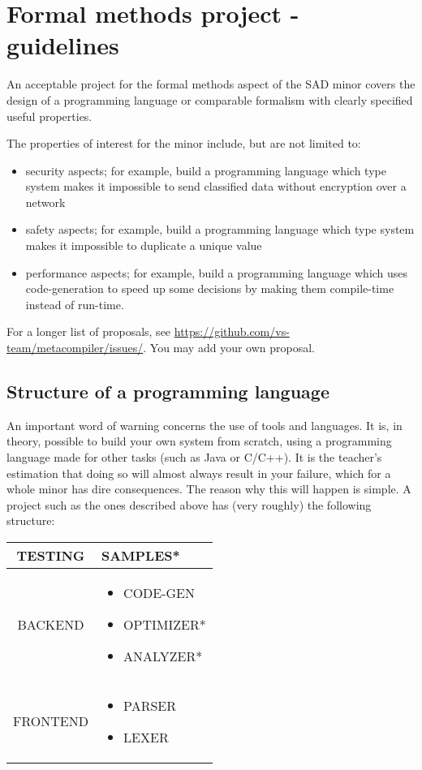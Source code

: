 \section*{Formal methods project - guidelines}
	An acceptable project for the formal methods aspect of the SAD minor covers the design of a programming language or comparable formalism with clearly specified useful properties.

	The properties of interest for the minor include, but are not limited to:
		\begin{itemize}
			\item security aspects; for example, build a programming language which type system makes it impossible to send classified data without encryption over a network
			\item safety aspects; for example, build a programming language which type system makes it impossible to duplicate a unique value
			\item performance aspects; for example, build a programming language which uses code-generation to speed up some decisions by making them compile-time instead of run-time.
		\end{itemize}
		
	For a longer list of proposals, see \url{https://github.com/vs-team/metacompiler/issues/}. You may add your own proposal.

	\subsection*{Structure of a programming language}
		An important word of warning concerns the use of tools and languages. It is, in theory, possible to build your own system from scratch, using a programming language made for other tasks (such as Java or C/C++). It is the teacher's estimation that doing so will almost always result in your failure, which for a whole minor has dire consequences. The reason why this will happen is simple. A project such as the ones described above has (very roughly) the following structure: \\

		\begin{tabular}{| c | p{5cm} |}
			\hline
			TESTING & SAMPLES* \\
			\hline
			BACKEND & 	\begin{itemize}
							\item CODE-GEN
							\item OPTIMIZER*
							\item ANALYZER*
						\end{itemize} \\
			\hline
			FRONTEND & 	\begin{itemize}
							\item PARSER
							\item LEXER
						\end{itemize} \\
			\hline
		\end{tabular} \\


